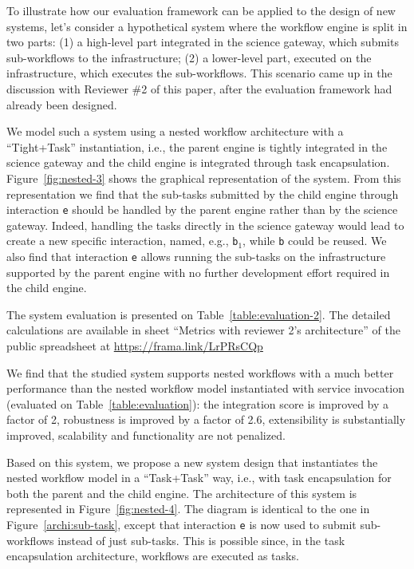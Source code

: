 \documentclass[preprint,3p,twocolumn]{elsarticle}
\newcommand{\todo}[2]{\pdfmargincomment[color=red,author=#1,open=true]{#2}}
\newcommand{\correction}[1]{\color{blue}#1\color{black}\xspace}
\begin{document}
\correction{To illustrate how our evaluation framework can be applied
  to the design of new systems, let's consider a hypothetical system
  where the workflow engine is split in two parts: (1) a high-level
  part integrated in the science gateway, which submits sub-workflows
  to the infrastructure; (2) a lower-level part, executed on the
  infrastructure, which executes the sub-workflows. This scenario came
  up in the discussion with Reviewer \#2 of this paper, after the
  evaluation framework had already been designed.

  We model such a system using a nested workflow architecture with a
  ``Tight+Task'' instantiation, i.e., the parent engine is tightly
  integrated in the science gateway and the child engine is
  integrated through task encapsulation.  Figure~\ref{fig:nested-3}
  shows the graphical representation of the system. From this
  representation we find that the sub-tasks submitted by the child
  engine through interaction \texttt{e} should be handled by the
  parent engine rather than by the science gateway. Indeed, handling
  the tasks directly in the science gateway would lead to create a new
  specific interaction, named, e.g., \texttt{b$_1$}, while \texttt{b}
  could be reused. We also find that interaction \texttt{e} allows
  running the sub-tasks on the infrastructure supported by the parent
  engine with no further development effort required in the child
  engine.

The system evaluation is presented on
Table~\ref{table:evaluation-2}. The detailed calculations are
available in sheet ``Metrics with reviewer 2's architecture'' of the public spreadsheet at \url{https://frama.link/LrPRsCQp} \todo{revise that sheet to merge it with the main one}.

We find that the studied system supports nested workflows with a much
better performance than the nested workflow model instantiated with
service invocation (evaluated on Table~\ref{table:evaluation}): the
integration score is improved by a factor of 2, robustness is
improved by a factor of 2.6, extensibility is substantially
improved, scalability and functionality are not penalized.

Based on this system, we propose a new system design that instantiates
the nested workflow model in a ``Task+Task'' way, i.e., with task
encapsulation for both the parent and the child engine. The
architecture of this system is represented in
Figure~\ref{fig:nested-4}. The diagram is identical to the one in
Figure~\ref{archi:sub-task}, except that interaction \texttt{e} is now
used to submit sub-workflows instead of just sub-tasks. This is
possible since, in the task encapsulation architecture, workflows are
executed as tasks.

}
\end{document}
